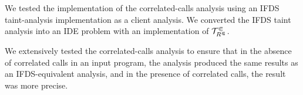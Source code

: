 We tested the implementation of the correlated-calls analysis using an IFDS taint-analysis implementation as a client analysis. We converted the IFDS taint analysis into an IDE problem with an implementation of $\mathcal T^\Subset_{R^\Subset}$.

We extensively tested the correlated-calls analysis to ensure that in the absence of correlated calls in an input program, the analysis produced the same results as an IFDS-equivalent analysis, and in the presence of correlated calls, the result was more precise.

